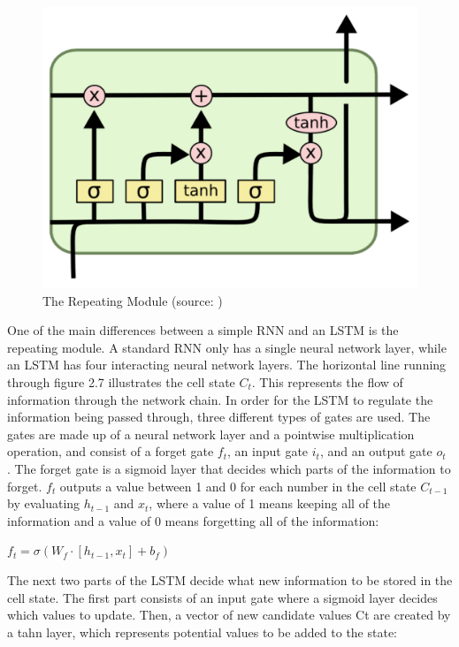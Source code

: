 \indent\newline 
\begin{figure}[H]
\centering
\includegraphics [scale=0.40,angle=360]{figures/module.png}
\caption{The Repeating Module (source: \cite{olah})}
\label{fig:module}
\end{figure}

\indent\newline 
One of the main differences between a simple RNN and an LSTM is the repeating module. A standard RNN only has a single neural network layer, while an LSTM has four interacting neural network layers. The horizontal line running through figure 2.7 illustrates the cell state $C_{t}$. This represents the flow of information through the network chain. In order for the LSTM to regulate the information being passed through, three different types of gates are used. The gates are made up of a neural network layer and a pointwise multiplication operation, and consist of a forget gate $f_{t}$, an input gate $i_{t}$, and an output gate $o_{t}$ \cite{olah}. The forget gate is a sigmoid layer that decides which parts of the information to forget. $f_{t}$ outputs a value between 1 and 0 for each number in the cell state $C_{t-1}$ by evaluating $h_{t-1}$ and $x_{t}$, where a value of 1 means keeping all of the information and a value of 0 means forgetting all of the information:

\indent\newline 
$f_{t} = \sigma(W_{f} \cdot[h_{t-1},x_{t}] + b_{f})$

\indent\newline 
The next two parts of the LSTM decide what new information to be stored in the cell state. The first part consists of an input gate where a sigmoid layer decides which values to update\cite{olah}. Then, a vector of new candidate values Ct are created by a tahn layer, which represents potential values to be added to the state:

